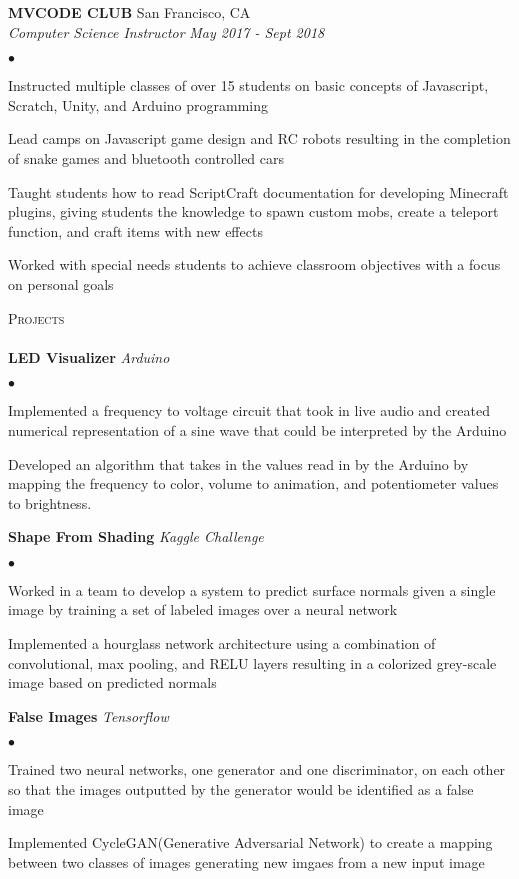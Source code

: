 \documentclass[letterpaper, 11pt]{article}
\newcommand{\lineunder}{\vspace*{-8pt} \\ \hspace*{-18pt} \hrulefill \\}
\newcommand{\header}[1]{{\hspace*{-15pt}\vspace*{6pt} \textsc{#1}}\vspace*{-6pt} \lineunder}
\newcommand{\employer}[4]{{\textbf{\uppercase{#1}} \hfill#2\\
\emph{#3}} \hfill\textit{#4} \vspace*{1pt}}
\newenvironment{achievements}{\begin{list}{$\bullet$}{\topsep 0pt \itemsep -2pt}}{\vspace*{4pt}\end{list}}
\begin{document}
\employer{MVCode Club}{San Francisco, CA}
{Computer Science Instructor}{May 2017 - Sept 2018}
	\begin{achievements}
		\item Instructed multiple classes of over 15 students on basic concepts of Javascript, Scratch, Unity, and Arduino programming
		\item Lead camps on Javascript game design and RC robots resulting in the completion of snake games and bluetooth controlled cars
		\item Taught students how to read ScriptCraft documentation for developing Minecraft plugins, giving students the knowledge to spawn custom mobs, create a teleport function, and craft items with new effects
		\item Worked with special needs students to achieve classroom objectives with a focus on personal goals 
	\end{achievements}


\header{Projects}

\textbf{LED Visualizer} \textit{Arduino}
\begin{achievements}
	\item Implemented a frequency to voltage circuit that took in live audio and created numerical representation of a sine wave that could be interpreted by the Arduino
	\item Developed an algorithm that takes in the values read in by the Arduino by mapping the frequency to color, volume to animation, and potentiometer values to brightness.
\end{achievements}

\textbf{Shape From Shading} \textit{Kaggle Challenge}
\begin{achievements}
	\item Worked in a team to develop a system to predict surface normals given a single image by training a set of labeled images over a neural network
	\item Implemented a hourglass network architecture using a combination of convolutional, max pooling, and RELU layers resulting in a colorized grey-scale image based on predicted normals
\end{achievements}

\textbf{False Images} \textit{Tensorflow}
\begin{achievements}
	\item Trained two neural networks, one generator and one discriminator, on each other so that the images outputted by the generator would be identified as a false image
	\item Implemented CycleGAN(Generative Adversarial Network) to create a mapping between two classes of images generating new imgaes from a new input image
\end{achievements}
\end{document}
